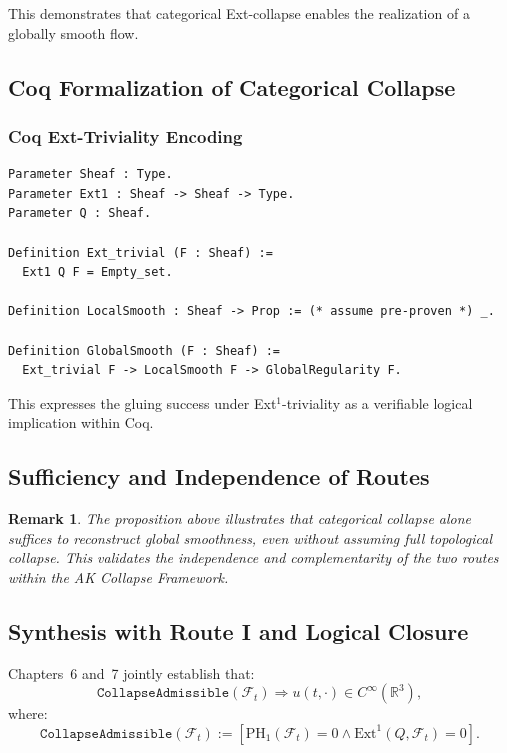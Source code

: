 \documentclass[11pt]{article}
\newtheorem{remark}[theorem]{Remark}
\begin{document}
This demonstrates that categorical Ext-collapse enables the realization of a globally smooth flow.

\subsection{Coq Formalization of Categorical Collapse}

\subsubsection*{Coq Ext-Triviality Encoding}
\begin{lstlisting}
Parameter Sheaf : Type.
Parameter Ext1 : Sheaf -> Sheaf -> Type.
Parameter Q : Sheaf.

Definition Ext_trivial (F : Sheaf) :=
  Ext1 Q F = Empty_set.

Definition LocalSmooth : Sheaf -> Prop := (* assume pre-proven *) _.

Definition GlobalSmooth (F : Sheaf) :=
  Ext_trivial F -> LocalSmooth F -> GlobalRegularity F.
\end{lstlisting}

This expresses the gluing success under Ext$^1$-triviality as a verifiable logical implication within Coq.

\subsection{Sufficiency and Independence of Routes}

\begin{remark}
The proposition above illustrates that categorical collapse alone suffices to reconstruct global smoothness, even without assuming full topological collapse. This validates the independence and complementarity of the two routes within the AK Collapse Framework.
\end{remark}

\subsection{Synthesis with Route I and Logical Closure}

Chapters~6 and~7 jointly establish that:
\[
\texttt{CollapseAdmissible}(\mathcal{F}_t) \Longrightarrow u(t, \cdot) \in C^\infty(\mathbb{R}^3),
\]
where:
\[
\texttt{CollapseAdmissible}(\mathcal{F}_t) := \left[
\mathrm{PH}_1(\mathcal{F}_t) = 0 \wedge \mathrm{Ext}^1(Q, \mathcal{F}_t) = 0
\right].
\]
\end{document}
